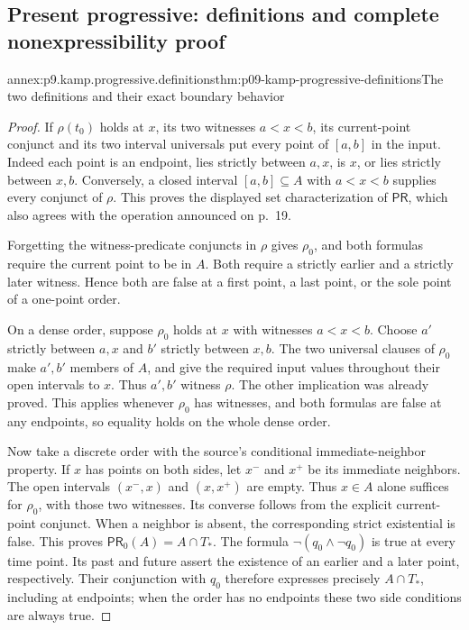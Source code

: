 
\subsection{Present progressive: definitions and complete nonexpressibility proof}
\label{sec:annex-p09-kamp-present-progressive}

\begin{annexitem}{annex:p9.kamp.progressive.definitions}{thm:p09-kamp-progressive-definitions}{The two definitions and their exact boundary behavior}
\begin{proof}
If \(\rho(t_0)\) holds at \(x\), its two witnesses
\(a<x<b\), its current-point conjunct and its two interval
universals put every point of \([a,b]\) in the input.
Indeed each point is an endpoint, lies strictly between
\(a,x\), is \(x\), or lies strictly between \(x,b\).
Conversely, a closed interval \([a,b]\subseteq A\) with
\(a<x<b\) supplies every conjunct of \(\rho\). This
proves the displayed set characterization of \(\mathsf{PR}\),
which also agrees with the operation announced on p.~19.

Forgetting the witness-predicate conjuncts in \(\rho\)
gives \(\rho_0\), and both formulas require the current
point to be in \(A\). Both require a strictly earlier
and a strictly later witness. Hence both are false at a
first point, a last point, or the sole point of a
one-point order.

On a dense order, suppose \(\rho_0\) holds at \(x\)
with witnesses \(a<x<b\). Choose \(a'\) strictly
between \(a,x\) and \(b'\) strictly between \(x,b\).
The two universal clauses of \(\rho_0\) make
\(a',b'\) members of \(A\), and give the required
input values throughout their open intervals to \(x\).
Thus \(a',b'\) witness \(\rho\). The other implication
was already proved. This applies whenever \(\rho_0\)
has witnesses, and both formulas are false at any endpoints,
so equality holds on the whole dense order.

Now take a discrete order with the source's conditional
immediate-neighbor property. If \(x\) has points on
both sides, let \(x^-\) and \(x^+\) be its immediate
neighbors. The open intervals \((x^-,x)\) and
\((x,x^+)\) are empty. Thus \(x\in A\) alone
suffices for \(\rho_0\), with those two witnesses.
Its converse follows from the explicit current-point
conjunct. When a neighbor is absent, the corresponding
strict existential is false. This proves
\(\mathsf{PR}_0(A)=A\cap T_*\).
The formula \(\neg(q_0\land\neg q_0)\) is true at
every time point. Its past and future assert the existence
of an earlier and a later point, respectively. Their
conjunction with \(q_0\) therefore expresses precisely
\(A\cap T_*\), including at endpoints; when the order
has no endpoints these two side conditions are always true.


\end{proof}
\end{annexitem}
